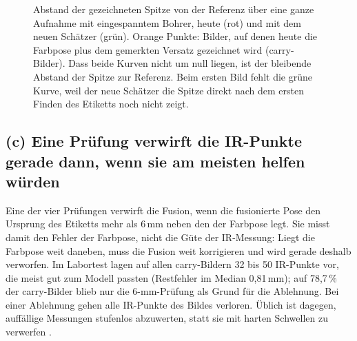 \documentclass[11pt,a4paper,fleqn]{article}
\begin{document}
\begin{figure}[!htb]
\centering
{}
\caption{Abstand der gezeichneten Spitze von der Referenz über eine ganze Aufnahme mit eingespanntem Bohrer, heute
(rot) und mit dem neuen Schätzer (grün). Orange Punkte: Bilder, auf denen heute die Farbpose plus dem gemerkten
Versatz gezeichnet wird (carry-Bilder). Dass beide Kurven nicht um null liegen, ist der bleibende Abstand der
Spitze zur Referenz. Beim ersten Bild fehlt die grüne Kurve, weil der neue Schätzer die Spitze direkt nach dem
ersten Finden des Etiketts noch nicht zeigt.}
\label{fig:zeitreihe}
\end{figure}

\subsection*{(c) Eine Prüfung verwirft die IR-Punkte gerade dann, wenn sie am meisten helfen würden}

Eine der vier Prüfungen verwirft die Fusion, wenn die fusionierte Pose den Ursprung des Etiketts mehr als 6\,mm
neben den der Farbpose legt. Sie misst damit den Fehler der Farbpose, nicht die Güte der IR-Messung: Liegt die
Farbpose weit daneben, muss die Fusion weit korrigieren und wird gerade deshalb verworfen. Im Labortest lagen auf
allen carry-Bildern 32 bis 50 IR-Punkte vor, die meist gut zum Modell passten (Restfehler im Median 0,81\,mm); auf
78,7\,\% der carry-Bilder blieb nur die 6-mm-Prüfung als Grund für die Ablehnung. Bei einer Ablehnung gehen alle
IR-Punkte des Bildes verloren. Üblich ist dagegen, auffällige Messungen stufenlos abzuwerten, statt sie mit harten
Schwellen zu verwerfen \cite[§9.3--9.4]{zhang1997parameter}.
\end{document}
